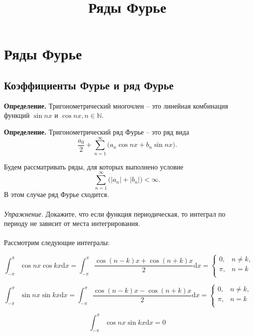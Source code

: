 \documentclass[12pt]{article}
\title{Ряды Фурье}
\begin{document}
\tableofcontents
\newpage

\section{Ряды Фурье}

\subsection{Коэффициенты Фурье и ряд Фурье}

\textbf{Определение.} Тригонометрический многочлен -- это линейная комбинация функций $\sin{nx}$ и $\cos{nx}, n \in \mathbb{N}$.

\textbf{Определение.} Тригонометрический ряд Фурье -- это ряд вида $$\frac{a_0}{2} + \sum_{n=1}^\infty  \big(a_n \cos{nx} + b_n \sin{nx}\big).$$

Будем рассматривать ряды, для которых выполнено условие $$\sum_{n=1}^\infty \big( |a_n| + |b_n| \big) < \infty.$$ В этом случае ряд Фурье сходится.

\paragraph{}

\textit{Упражнение.} Докажите, что если функция периодическая, то интеграл по периоду не зависит от места интегрирования.

\paragraph{}

Рассмотрим следующие интегралы:

$$\int_{-\pi}^{\pi} \cos{nx} \cos{kx} \mathrm{d}x = \int_{-\pi}^{\pi} \frac{\cos{(n-k)x} + \cos{(n+k)x}}{2} \mathrm{d}x = \begin{cases}
    0,   & n \ne k, \\
    \pi, & n =  k \\
\end{cases}$$


$$\int_{-\pi}^{\pi} \sin{nx} \sin{kx} \mathrm{d}x = \int_{-\pi}^{\pi} \frac{\cos{(n-k)x} - \cos{(n+k)x}}{2} \mathrm{d}x = \begin{cases}
    0,   & n \ne k, \\
    \pi, & n =  k \\
\end{cases}$$

$$\int_{-\pi}^{\pi} \cos{nx} \sin{kx} \mathrm{d}x = 0 $$
\end{document}
